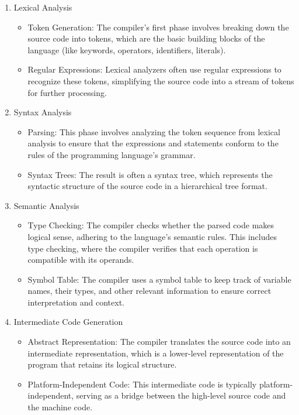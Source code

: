 \begin{enumerate}
    \item Lexical Analysis
          \begin{itemize}
              \item Token Generation: The compiler's first phase involves breaking down the source code into tokens, which are the basic building blocks of the language (like keywords, operators, identifiers, literals).
              \item Regular Expressions: Lexical analyzers often use regular expressions to recognize these tokens, simplifying the source code into a stream of tokens for further processing.
          \end{itemize}

    \item Syntax Analysis
          \begin{itemize}
              \item Parsing: This phase involves analyzing the token sequence from lexical analysis to ensure that the expressions and statements conform to the rules of the programming language's grammar.
              \item Syntax Trees: The result is often a syntax tree, which represents the syntactic structure of the source code in a hierarchical tree format.
          \end{itemize}
    \item Semantic Analysis
          \begin{itemize}
              \item Type Checking: The compiler checks whether the parsed code makes logical sense, adhering to the language's semantic rules. This includes type checking, where the compiler verifies that each operation is compatible with its operands.
              \item Symbol Table: The compiler uses a symbol table to keep track of variable names, their types, and other relevant information to ensure correct interpretation and context.
          \end{itemize}
    \item Intermediate Code Generation
          \begin{itemize}
              \item Abstract Representation: The compiler translates the source code into an intermediate representation, which is a lower-level representation of the program that retains its logical structure.
              \item Platform-Independent Code: This intermediate code is typically platform-independent, serving as a bridge between the high-level source code and the machine code.

\end{itemize}
\end{enumerate}
